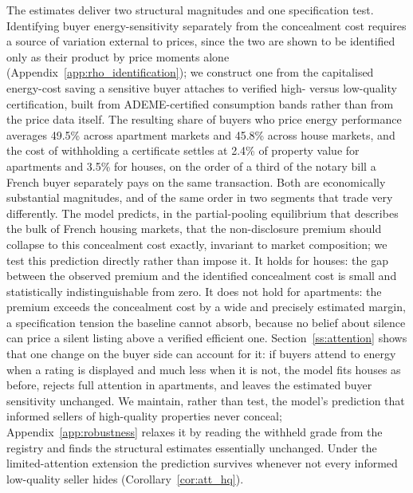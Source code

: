 The estimates deliver two structural magnitudes and one specification test. Identifying buyer
energy-sensitivity separately from the concealment cost requires a source of variation external
to prices, since the two are shown to be identified only as their product by price moments
alone (Appendix~\ref{app:rho_identification}); we construct one from the capitalised energy-cost
saving a sensitive buyer attaches to verified high- versus low-quality certification, built from
ADEME-certified consumption bands rather than from the price data itself. The resulting share of
buyers who price energy performance averages 49.5\% across apartment markets and 45.8\% across
house markets, and the cost of withholding a certificate settles at 2.4\% of property value for
apartments and 3.5\% for houses, on the order of a third of the notary bill a French buyer
separately pays on the same transaction. Both are economically substantial magnitudes, and of the
same order in two segments that trade very differently. The model predicts, in the partial-pooling
equilibrium that describes the bulk of French housing markets, that the non-disclosure premium
should collapse to this concealment cost exactly, invariant to market composition; we test this
prediction directly rather than impose it. It holds for houses: the gap between the observed
premium and the identified concealment cost is small and statistically indistinguishable from
zero. It does not hold for apartments: the premium exceeds the concealment cost by a wide and
precisely estimated margin, a specification tension the baseline cannot absorb, because no belief
about silence can price a silent listing above a verified efficient one.
Section~\ref{ss:attention} shows that one change on the buyer side can account for it: if buyers attend
to energy when a rating is displayed and much less when it is not, the model fits houses as before,
rejects full attention in apartments, and leaves the estimated buyer sensitivity unchanged.
We maintain, rather than test, the model's prediction that informed sellers of high-quality
properties never conceal; Appendix~\ref{app:robustness} relaxes it by reading the withheld grade
from the registry and finds the structural estimates essentially unchanged. Under the limited-attention
extension the prediction survives whenever not every informed low-quality seller hides (Corollary~\ref{cor:att_hq}).
